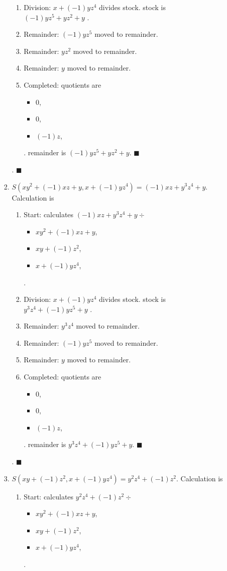\documentclass[9pt]{ltjsarticle}
\begin{document}
\begin{enumerate}[label=(問題 \arabic*)]
\begin{enumerate}[label=(\alph*)]
\begin{enumerate}
\begin{enumerate}
      \item Division: $x+(-1)yz^{4}$ divides stock. stock is $(-1)yz^{5}+yz^{2}+y$ .
      \item Remainder: $(-1)yz^{5}$ moved to remainder.
      \item Remainder: $yz^{2}$ moved to remainder.
      \item Remainder: $y$ moved to remainder.
      \item Completed: quotients are \begin{itemize}
      \item $0$,
      \item $0$,
      \item $(-1)z$,
      \end{itemize} .
      remainder is $(-1)yz^{5}+yz^{2}+y$.  $\blacksquare$
      \end{enumerate}
      .  $\blacksquare{}$\item $S(xy^{2}+(-1)xz+y, x+(-1)yz^{4}) = (-1)xz+y^{3}z^{4}+y$.  Calculation is \begin{enumerate}
      \item Start: calculates $(-1)xz+y^{3}z^{4}+y\div $\begin{itemize}
      \item $xy^{2}+(-1)xz+y$,
      \item $xy+(-1)z^{2}$,
      \item $x+(-1)yz^{4}$,
      \end{itemize} .

      \item Division: $x+(-1)yz^{4}$ divides stock. stock is $y^{3}z^{4}+(-1)yz^{5}+y$ .
      \item Remainder: $y^{3}z^{4}$ moved to remainder.
      \item Remainder: $(-1)yz^{5}$ moved to remainder.
      \item Remainder: $y$ moved to remainder.
      \item Completed: quotients are \begin{itemize}
      \item $0$,
      \item $0$,
      \item $(-1)z$,
      \end{itemize} .
      remainder is $y^{3}z^{4}+(-1)yz^{5}+y$.  $\blacksquare$
      \end{enumerate}
      .  $\blacksquare{}$\item $S(xy+(-1)z^{2}, x+(-1)yz^{4}) = y^{2}z^{4}+(-1)z^{2}$.  Calculation is \begin{enumerate}
      \item Start: calculates $y^{2}z^{4}+(-1)z^{2}\div $\begin{itemize}
      \item $xy^{2}+(-1)xz+y$,
      \item $xy+(-1)z^{2}$,
      \item $x+(-1)yz^{4}$,
      \end{itemize} .


\end{enumerate}
\end{enumerate}
\end{enumerate}
\end{enumerate}
\end{document}
